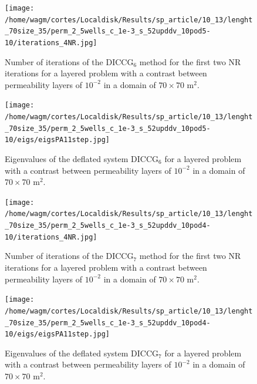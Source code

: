 \documentclass[12pt]{article}
\begin{document}
\begin{figure}[!h]
\centering
\begin{minipage}{.4\textwidth}
\vspace{-0.4cm}
\hspace{-1cm}
\texttt{[image: /home/wagm/cortes/Localdisk/Results/sp\_article/10\_13/lenght\_70size\_35/perm\_2\_5wells\_c\_1e-3\_s\_52upddv\_10pod5-10/iterations\_4NR.jpg]}
\vspace{-1.3cm}
\caption{Number of iterations of the DICCG$_6$ method for the first two NR iterations for a layered problem with a contrast between permeability layers of $10^{-2}$ in a domain of $70 \times 70$ m$^2$.}
\label{fig:NR_D6_2}
\end{minipage}%
\hspace{15mm}
\begin{minipage}{.4\textwidth}
 \centering
\texttt{[image: /home/wagm/cortes/Localdisk/Results/sp\_article/10\_13/lenght\_70size\_35/perm\_2\_5wells\_c\_1e-3\_s\_52upddv\_10pod5-10/eigs/eigsPA11step.jpg]}
\caption{Eigenvalues of the deflated system DICCG$_6$ for a layered problem with a contrast between permeability layers of $10^{-2}$ in a domain of $70 \times 70$ m$^2$.}
\label{fig:eigs_PA6_2}
\end{minipage}
\end{figure}

\begin{figure}[!h]
\centering
\begin{minipage}{.4\textwidth}
\vspace{-0.4cm}
\hspace{-1cm}
\texttt{[image: /home/wagm/cortes/Localdisk/Results/sp\_article/10\_13/lenght\_70size\_35/perm\_2\_5wells\_c\_1e-3\_s\_52upddv\_10pod4-10/iterations\_4NR.jpg]}
\vspace{-1.3cm}
\caption{Number of iterations of the DICCG$_7$ method for the first two NR iterations for a layered problem with a contrast between permeability layers of $10^{-2}$ in a domain of $70 \times 70$ m$^2$.}
\label{fig:NR_D7_2}
\end{minipage}%
\hspace{15mm}
\begin{minipage}{.4\textwidth}
 \centering
\texttt{[image: /home/wagm/cortes/Localdisk/Results/sp\_article/10\_13/lenght\_70size\_35/perm\_2\_5wells\_c\_1e-3\_s\_52upddv\_10pod4-10/eigs/eigsPA11step.jpg]}
\caption{Eigenvalues of the deflated system DICCG$_7$ for a layered problem with a contrast between permeability layers of $10^{-2}$ in a domain of $70 \times 70$ m$^2$.}
\label{fig:eigs_PA7_2}
\end{minipage}
\end{figure}
\newpage
\end{document}
